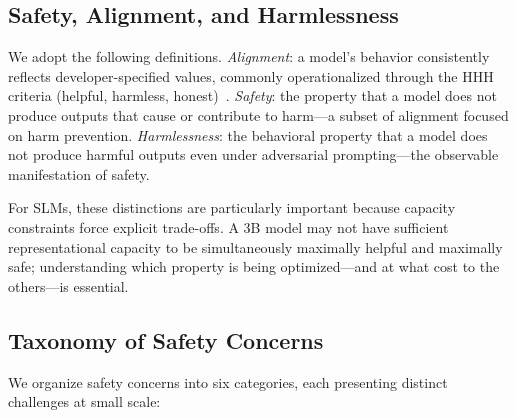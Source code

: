 \documentclass[12pt,a4paper]{article}
\begin{document}
\subsection{Safety, Alignment, and Harmlessness}\label{sec:definitions}

We adopt the following definitions. \emph{Alignment}: a model's behavior consistently reflects developer-specified values, commonly operationalized through the HHH criteria (helpful, harmless, honest)~\citep{bai2022constitutional}. \emph{Safety}: the property that a model does not produce outputs that cause or contribute to harm---a subset of alignment focused on harm prevention. \emph{Harmlessness}: the behavioral property that a model does not produce harmful outputs even under adversarial prompting---the observable manifestation of safety.

For SLMs, these distinctions are particularly important because capacity constraints force explicit trade-offs. A 3B model may not have sufficient representational capacity to be simultaneously maximally helpful and maximally safe; understanding which property is being optimized---and at what cost to the others---is essential.

\subsection{Taxonomy of Safety Concerns}

We organize safety concerns into six categories, each presenting distinct challenges at small scale:
\end{document}
